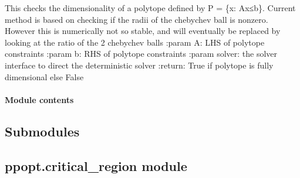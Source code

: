 \documentclass[letterpaper,10pt,english]{sphinxmanual}
\begin{document}
\begin{fulllineitems}
\label{\detokenize{ppopt.utils:ppopt.utils.mpqp_utils.is_full_dimensional}}
\sphinxAtStartPar
This checks the dimensionality of a polytope defined by P = \{x: Ax≤b\}. Current method is based on checking if the
radii of the chebychev ball is nonzero. However this is numerically not so stable, and will eventually be replaced
by looking at the ratio of the 2 chebychev balls
:param A: LHS of polytope constraints
:param b: RHS of polytope constraints
:param solver: the solver interface to direct the deterministic solver
:return: True if polytope is fully dimensional else False

\end{fulllineitems}



\paragraph{Module contents}
\label{\detokenize{ppopt.utils:module-ppopt.utils}}\label{\detokenize{ppopt.utils:module-contents}}

\subsection{Submodules}
\label{\detokenize{ppopt:submodules}}

\subsection{ppopt.critical\_region module}
\label{\detokenize{ppopt:module-ppopt.critical_region}}\label{\detokenize{ppopt:ppopt-critical-region-module}}
\end{document}
